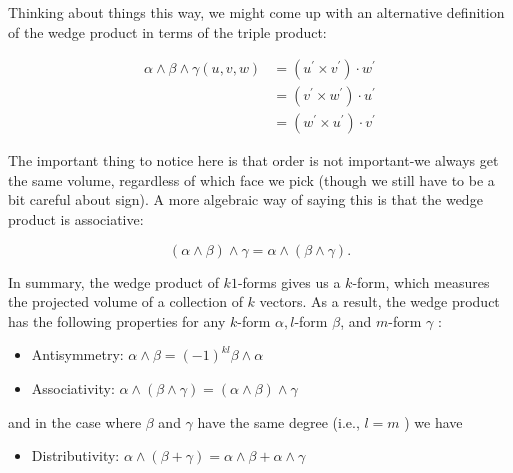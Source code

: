 \documentclass[10pt]{article}
\begin{document}
Thinking about things this way, we might come up with an alternative definition of the wedge product in terms of the triple product:

$$
\begin{aligned}
\alpha \wedge \beta \wedge \gamma(u, v, w) & =\left(u^{\prime} \times v^{\prime}\right) \cdot w^{\prime} \\
& =\left(v^{\prime} \times w^{\prime}\right) \cdot u^{\prime} \\
& =\left(w^{\prime} \times u^{\prime}\right) \cdot v^{\prime}
\end{aligned}
$$

The important thing to notice here is that order is not important-we always get the same volume, regardless of which face we pick (though we still have to be a bit careful about sign). A more algebraic way of saying this is that the wedge product is associative:

$$
(\alpha \wedge \beta) \wedge \gamma=\alpha \wedge(\beta \wedge \gamma) .
$$

In summary, the wedge product of $k 1$-forms gives us a $k$-form, which measures the projected volume of a collection of $k$ vectors. As a result, the wedge product has the following properties for any $k$-form $\alpha, l$-form $\beta$, and $m$-form $\gamma$ :

\begin{itemize}
  \item[-] Antisymmetry: $\alpha \wedge \beta=(-1)^{k l} \beta \wedge \alpha$
  \item[-] Associativity: $\alpha \wedge(\beta \wedge \gamma)=(\alpha \wedge \beta) \wedge \gamma$
\end{itemize}

and in the case where $\beta$ and $\gamma$ have the same degree (i.e., $l=m$ ) we have

\begin{itemize}
  \item[-] Distributivity: $\alpha \wedge(\beta+\gamma)=\alpha \wedge \beta+\alpha \wedge \gamma$
\end{itemize}
\end{document}
